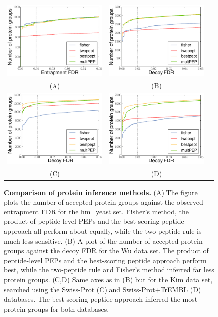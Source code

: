 \documentclass{article}
\begin{document}
\begin{figure}
\centering
\begin{tabular}{ccc}
\includegraphics[width=0.45\linewidth]
{./img/unique-pept-performance} &
\includegraphics[width=0.45\linewidth]
{./img/wu-ipi-performance}\\
(A) & (B)\\
\includegraphics[width=0.45\linewidth]
{./img/kim-swissprot-performance} &
\includegraphics[width=0.45\linewidth]
{./img/kim-uniprot-performance}\\
(C) & (D)
\end{tabular}
  \caption{{\bf Comparison of protein inference methods.} (A) The
figure plots the number of accepted protein groups against the
observed entrapment FDR for the hm\_yeast set. Fisher's method, the
product of peptide-level PEPs and the best-scoring peptide approach
all perform about equally, while the two-peptide rule is much less
sensitive. (B) A plot of the number of accepted protein groups against
the decoy FDR for the Wu data set. The product of peptide-level PEPs
and the best-scoring peptide approach perform best, while the
two-peptide rule and Fisher's method inferred far less protein groups.
(C,D) Same axes as in (B) but for the Kim data set, searched using the
Swiss-Prot (C) and Swiss-Prot+TrEMBL (D) databases. The best-scoring
peptide approach inferred the most protein groups for both databases.}
  \label{fig:power}
\end{figure}
\end{document}
